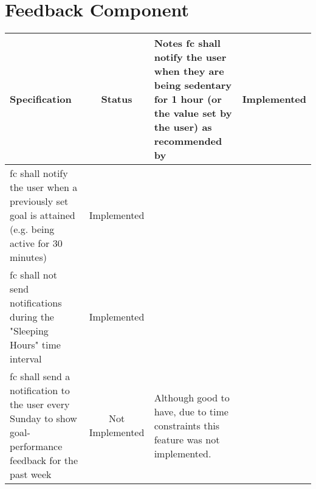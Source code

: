  \newpage
 \section{Feedback Component}
 \tabulinesep=1.5mm
  \begin{longtabu} to \textwidth {|X|c|X|}
    \hline
      \textbf{Specification}
      & \textbf{Status}
      & \textbf{Notes}
    \endhead \hline
    \gls{fc} shall notify the user when they are being sedentary for 1 hour (or the value set by the user) as recommended by \citet[]{swartz2011}
    & Implemented
    & 
    \\ \hline
    \gls{fc} shall notify the user when a previously set goal is attained (e.g. being active for 30 minutes)
    & Implemented
    & 
    \\ \hline
    \gls{fc} shall not send notifications during the "Sleeping Hours" time interval
    & Implemented
    & 
    \\ \hline
    \gls{fc} shall send a notification to the user every Sunday to show goal-performance feedback for the past week
    & Not Implemented
    & Although good to have, due to time constraints this feature was not implemented.
    \\ \hline
 \end{longtabu}
 